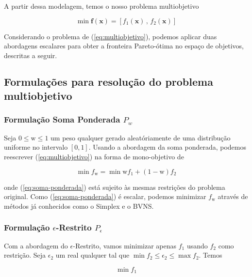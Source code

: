 \documentclass[conference]{IEEEtran}
\begin{document}
A partir dessa modelagem, temos o nosso problema multiobjetivo 

\begin{equation} \label{eq:multiobjetivo}
	\min \mathbf{f}\left( \mathbf{x} \right) = \left[ f_1\left( \mathbf{x} \right) \, , \, f_2\left( \mathbf{x} \right) \right]
\end{equation}

Considerando o problema de (\ref{eq:multiobjetivo}), podemos aplicar duas abordagens escalares 
para obter a fronteira Pareto-ótima no espaço de objetivos, descritas a seguir.

\subsection{Formulações para resolução do problema multiobjetivo}

\subsubsection{Formulação Soma Ponderada $P_{w}$}

Seja $0 \leq \mathrm{w} \leq 1$ um peso qualquer gerado aleatóriamente de uma distribução 
uniforme no intervalo $[0, 1]$. Usando a abordagem da soma ponderada, podemos reescrever 
(\ref{eq:multiobjetivo}) na forma de mono-objetivo de

\begin{equation} \label{eq:soma-ponderada}
	\min f_{\mathrm{w}} = \min \mathrm{w}f_1 + (1-\mathrm{w})f_2
\end{equation}

\noindent onde (\ref{eq:soma-ponderada}) está sujeito às mesmas restrições 
do problema original. Como (\ref{eq:soma-ponderada}) é escalar, podemos 
minimizar $f_{\mathrm{w}}$ através de métodos já conhecidos como o Simplex e o 
BVNS. 

\subsubsection{Formulação $\epsilon$-Restrito $P_{\epsilon}$}

Com a abordagem do $\epsilon$-Restrito, vamos minimizar apenas $f_1$ 
usando $f_2$ como restrição. Seja $\epsilon_2$ um real qualquer tal que  $\min f_2 \leq \epsilon_2 \leq \max f_2$.
Temos 

\begin{equation}\label{eq:epsilon}
	\min f_1
\end{equation}
\end{document}
